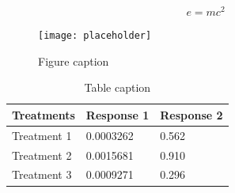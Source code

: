 \documentclass[preprint,12pt]{elsarticle}
\begin{document}






\begin{equation}
\label{eq:emc}
e = mc^2
\end{equation}

\begin{figure}[h]
\centering\texttt{[image: placeholder]}
\caption{Figure caption}
\end{figure}


\begin{table}[h]
\centering
\begin{tabular}{l l l}
\hline
\textbf{Treatments} & \textbf{Response 1} & \textbf{Response 2}\\
\hline
Treatment 1 & 0.0003262 & 0.562 \\
Treatment 2 & 0.0015681 & 0.910 \\
Treatment 3 & 0.0009271 & 0.296 \\
\hline
\end{tabular}
\caption{Table caption}
\end{table}
\end{document}
